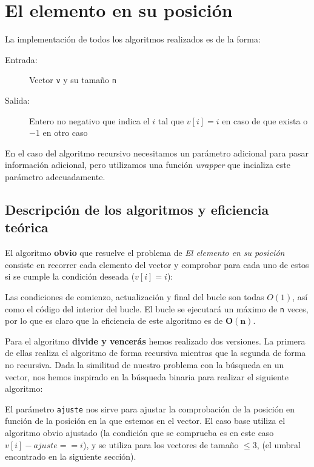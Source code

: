 \section{El elemento en su posición}

La implementación de todos los algoritmos realizados es de la forma:
\begin{description}
 \item[Entrada:] Vector \texttt{v} y su tamaño \texttt{n}
 \item[Salida:] Entero no negativo que indica el $i$ tal que $v[i]=i$ en caso de que exista o $-1$ en otro caso
\end{description}

En el caso del algoritmo recursivo necesitamos un parámetro adicional para pasar información adicional, pero utilizamos una función \textit{wrapper} que incializa este parámetro adecuadamente.

\subsection{Descripción de los algoritmos y eficiencia teórica}

El algoritmo \textbf{obvio} que resuelve el problema de \textit{El elemento en su posición} consiste
en recorrer cada elemento del vector y comprobar para cada uno de estos si se cumple la
condición deseada ($v[i] = i$):



Las condiciones de comienzo, actualización y final del bucle son todas $O(1)$, así como el código del interior del bucle. El bucle se ejecutará un máximo de \texttt{n} veces, por lo que es claro que la eficiencia de este algoritmo es de $\mathbf{O(n)}$.

\vspace*{1cm}
\hrulefill
\vspace*{1cm}

Para el algoritmo \textbf{divide y vencerás} hemos realizado dos versiones. La primera de ellas realiza el algoritmo de forma recursiva mientras que la segunda de forma no recursiva. Dada la similitud de nuestro problema con la búsqueda en un vector, nos hemos inspirado en la búsqueda binaria para realizar el siguiente algoritmo:



El parámetro \texttt{ajuste} nos sirve para ajustar la comprobación de la posición en función de la posición en la que estemos en el vector.
El caso base utiliza el algoritmo obvio ajustado (la condición que se comprueba es en este caso $v[i]-ajuste == i$), y se utiliza para los vectores de tamaño $\leq 3$, (el umbral encontrado en la siguiente sección).

